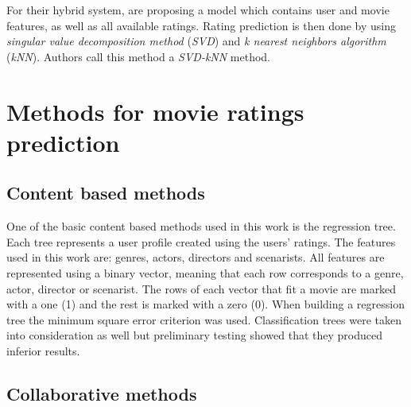 \documentclass[conference,a4paper]{IEEEtran}
\begin{document}
For their hybrid system, \cite{spiegel2009hydra} are proposing a model which
contains user and movie features, as well as all available ratings. Rating
prediction is then done by using \emph{singular value decomposition method}
(\emph{SVD}) and \emph{k nearest neighbors algorithm} (\emph{kNN}). Authors
call this method a \emph{SVD-kNN} method.

\section{Methods for movie ratings prediction}

\subsection{Content based methods}

One of the basic content based methods used in this work is the regression tree. Each tree
represents a user profile created using the users’ ratings. The features used in
this work are: genres, actors, directors and scenarists. All features are
represented using a binary vector, meaning that each row corresponds to a
genre, actor, director or scenarist. The rows of each vector that fit a movie
are marked with a one (1) and the rest is marked with a zero (0). When building
a regression tree the minimum square error criterion was used. Classification
trees were taken into consideration as well but preliminary testing showed that
they produced inferior results.
 

\subsection{Collaborative methods}
\end{document}
